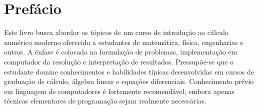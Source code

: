 
\chapter*{Prefácio}

Este livro busca abordar os tópicos de um curso de introdução ao cálculo numérico moderno oferecido a estudantes de matemática, física, engenharias e outros. A ênfase é colocada na formulação de problemas, implementação em computador da resolução e interpretação de resultados. Pressupõe-se que o estudante domine conhecimentos e habilidades típicas desenvolvidas em cursos de graduação de cálculo, álgebra linear e equações diferenciais. Conhecimento prévio em linguagem de computadores é fortemente recomendável, embora apenas técnicas elementares de programação sejam realmente necessárias.

